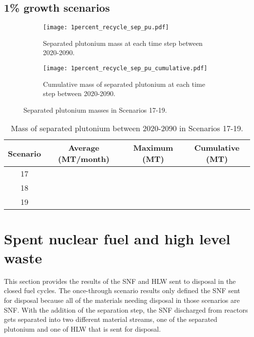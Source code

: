 \subsection{1\% growth scenarios}

\begin{figure}[h!]
    \centering
    \begin{subfigure}[b]{0.49\textwidth}
        \centering
        \texttt{[image: 1percent\_recycle\_sep\_pu.pdf]}
        \caption{Separated plutonium mass 
        at each time step between 2020-2090.}
        \label{fig:1percent_recycle_sep_pu_all}
    \end{subfigure}
    \hfill
    \begin{subfigure}[b]{0.49\textwidth}
        \centering
        \texttt{[image: 1percent\_recycle\_sep\_pu\_cumulative.pdf]}
        \caption{Cumulative mass of separated plutonium 
        at each time step between 2020-2090.}
        \label{fig:1percent_recycle_sep_pu_cumulative}
    \end{subfigure}
       \caption{Separated plutonium masses in Scenarios 17-19.}
       \label{fig:1percent_recycle_sep_pu}
\end{figure}

\begin{table}[h!]
    \centering 
    \caption{Mass of separated plutonium between 2020-2090 in Scenarios 
    17-19.}
    \label{tab:sep_pu_17-19}
    \begin{tabular}{c c c c}
        \hline 
        Scenario & Average (MT/month) & Maximum (MT) & Cumulative (MT) \\
        \hline
        17 &  &  & \\
        18 &  &  & \\
        19 &  &  & \\
        \hline
    \end{tabular}
\end{table}


\section{Spent nuclear fuel and high level waste}
This section provides the results of the \gls{SNF} and \gls{HLW} sent 
to disposal in the closed fuel cycles. The once-through scenario 
results only defined the \gls{SNF} sent for disposal because all 
of the materials needing disposal in those scenarios are \gls{SNF}. 
With the addition of the separation step, the \gls{SNF} discharged 
from reactors gets separated into two different material streams, 
one of the separated plutonium and one of \gls{HLW} that is sent 
for disposal.

